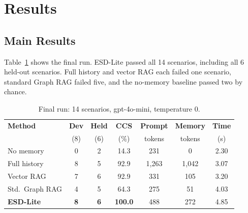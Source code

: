 \documentclass[conference]{IEEEtran}
\begin{document}
\section{Results}

\subsection{Main Results}
Table~\ref{tab_main} shows the final run. ESD-Lite passed all 14 scenarios, including all 6 held-out scenarios. Full history and vector RAG each failed one scenario, standard Graph RAG failed five, and the no-memory baseline passed two by chance.

\begin{table}[t]
\caption{Final run: 14 scenarios, gpt-4o-mini, temperature 0.}
\centering
\footnotesize
\setlength{\tabcolsep}{2.6pt}
\begin{tabular}{@{}lcccccc@{}}
\toprule
\textbf{Method} & \textbf{Dev} & \textbf{Held} & \textbf{CCS} & \textbf{Prompt} & \textbf{Memory} & \textbf{Time} \\
 & (8) & (6) & (\%) & tokens & tokens & (s) \\
\midrule
No memory & 0 & 2 & 14.3 & 231 & 0 & 2.30 \\
Full history & 8 & 5 & 92.9 & 1{,}263 & 1{,}042 & 3.07 \\
Vector RAG & 7 & 6 & 92.9 & 331 & 105 & 3.20 \\
Std.\ Graph RAG & 4 & 5 & 64.3 & 275 & 51 & 4.03 \\
\midrule
\textbf{ESD-Lite} & \textbf{8} & \textbf{6} & \textbf{100.0} & 488 & 272 & 4.85 \\
\bottomrule
\end{tabular}
\label{tab_main}
\end{table}
\end{document}
